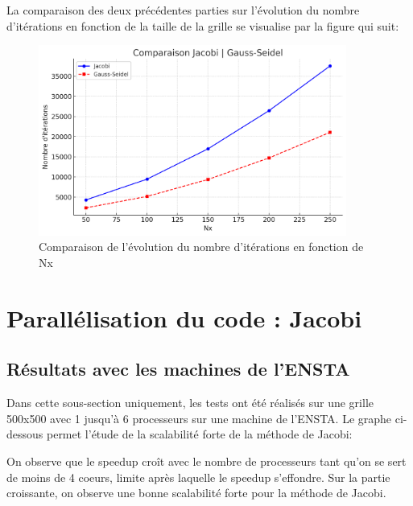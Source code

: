 \documentclass{article}
\begin{document}
La comparaison des deux précédentes parties sur l'évolution du nombre d'itérations en fonction de la taille de la grille se visualise par la figure qui suit:

\begin{figure}[H]
    \centering
    \includegraphics[width=0.9\textwidth]{comparaison_j_gs.png}
    \caption{Comparaison de l'évolution du nombre d'itérations en fonction de Nx}
    \label{fig:placeholder}
\end{figure}

\section{Parallélisation du code : Jacobi}

\subsection{Résultats avec les machines de l'ENSTA}

Dans cette sous-section uniquement, les tests ont été réalisés sur une grille 500x500 avec 1 jusqu'à 6 processeurs sur une machine de l'ENSTA. Le graphe ci-dessous permet l'étude de la scalabilité forte de la méthode de Jacobi:



On observe que le speedup croît avec le nombre de processeurs tant qu'on se sert de moins de 4 coeurs, limite après laquelle le speedup s'effondre. Sur la partie croissante, on observe une bonne scalabilité forte pour la méthode de Jacobi.
\end{document}
